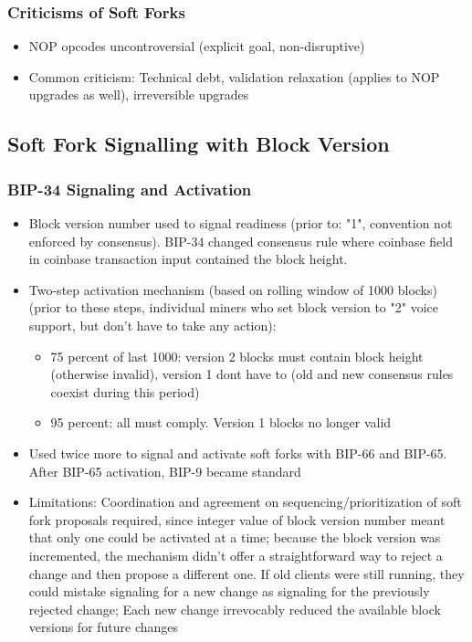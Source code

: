 \documentclass[english, 11pt]{article}
\begin{document}
\subsubsection{Criticisms of Soft Forks}
\begin{itemize}
    \item NOP opcodes uncontroversial (explicit goal, non-disruptive)
    \item Common criticism: Technical debt, validation relaxation (applies to NOP upgrades as well), irreversible upgrades
\end{itemize}

\subsection{Soft Fork Signalling with Block Version}
\subsubsection{BIP-34 Signaling and Activation}
\begin{itemize}
    \item Block version number used to signal readiness (prior to: "1", convention not enforced by consensus). BIP-34 changed consensus rule where coinbase field in coinbase transaction input contained the block height.
    \item Two-step activation mechanism (based on rolling window of 1000 blocks) (prior to these steps, individual miners who set block version to "2" voice support, but don't have to take any action): 
    \begin{itemize}
        \item 75 percent of last 1000: version 2 blocks must contain block height (otherwise invalid), version 1 dont have to (old and new consensus rules coexist during this period)
        \item 95 percent: all must comply. Version 1 blocks no longer valid
    \end{itemize}
    \item Used twice more to signal and activate soft forks with BIP-66 and BIP-65. After BIP-65 activation, BIP-9 became standard
    \item Limitations: Coordination and agreement on sequencing/prioritization of soft fork proposals required, since integer value of block version number meant that only one could be activated at a time; because the block version was incremented, the mechanism didn’t offer a straightforward way to reject a change and then propose a different one. If old clients were still running, they could mistake signaling for a new change as signaling for the previously rejected change; Each new change irrevocably reduced the available block versions for future changes
\end{itemize}
\end{document}
